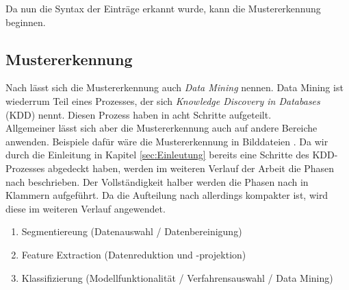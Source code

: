 Da nun die Syntax der Einträge erkannt wurde, kann die Mustererkennung beginnen.


\subsection{Mustererkennung}
\label{sub:Mustererkennung}
Nach \citet{BeKe19} lässt sich die Mustererkennung auch \textit{Data Mining} nennen. Data Mining ist wiederrum Teil eines Prozesses, der sich \textit{Knowledge Discovery in Databases} (KDD) nennt. Diesen Prozess haben \citet{BeKe19} in acht Schritte aufgeteilt.\\
Allgemeiner lässt sich aber die Mustererkennung auch auf andere Bereiche anwenden. Beispiele dafür wäre die Mustererkennung in Bilddateien \citep{DuHaSt01}. Da wir durch die Einleitung in Kapitel \ref{sec:Einleutung} bereits eine Schritte des KDD-Prozesses abgedeckt haben, werden im weiteren Verlauf der Arbeit die Phasen nach \citet{Wa11} beschrieben. Der Vollständigkeit halber werden die Phasen nach \citet{BeKe19} in Klammern aufgeführt. Da die Aufteilung nach \citet{Wa11} allerdings kompakter ist, wird diese im weiteren Verlauf angewendet.
\begin{enumerate}
	\item Segmentiereung (Datenauswahl / Datenbereinigung)
	\item Feature Extraction (Datenreduktion und -projektion)
	\item Klassifizierung (Modellfunktionalität / Verfahrensauswahl / Data Mining)
\end{enumerate}


